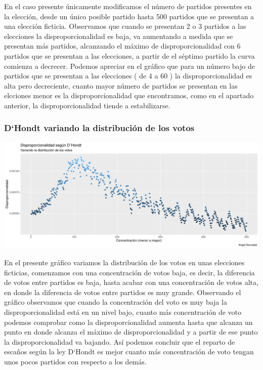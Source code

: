 \documentclass[12pt,a4paper,]{book}
\numberwithin{dummy}{section}
\theoremstyle{ocrenumbox}
\theoremstyle{blacknumex}
\theoremstyle{blacknumbox}
\theoremstyle{ocrenum}
\theoremstyle{ocrenum}
\begin{document}
En el caso presente únicamente modificamos el número de partidos
presentes en la elección, desde un único posible partido hasta 500
partidos que se presentan a una elección ficticia. Observamos que cuando
se presentan 2 o 3 partidos a las elecciones la disproporcionalidad es
baja, va aumentando a medida que se presentan más partidos, alcanzando
el máximo de disproporcionalidad con 6 partidos que se presentan a las
elecciones, a partir de el séptimo partido la curva comienza a decrecer.
Podemos apreciar en el gráfico que para un número bajo de partidos que
se presentan a las elecciones ( de 4 a 60 ) la disproporcionalidad es
alta pero decreciente, cuanto mayor número de partidos se presentan en
las elcciones menor es la disproporcionalidad que encontramos, como en
el apartado anterior, la disproporcionalidad tiende a estabilizarse.

\hypertarget{dhondt-variando-la-distribuciuxf3n-de-los-votos}{%
\subsubsection{D`Hondt variando la distribución de los
votos}\label{dhondt-variando-la-distribuciuxf3n-de-los-votos}}

\begin{center}\includegraphics[width=0.95\linewidth]{figurasR/unnamed-chunk-11-1} \end{center}

En el presente gráfico variamos la distribución de los votos en unas
elecciones ficticias, comenzamos con una concentración de votos baja, es
decir, la diferencia de votos entre partidos es baja, hasta acabar con
una concentración de votos alta, en donde la diferencia de votos entre
partidos es muy grande. Observando el gráfico observamos que cuando la
concentración del voto es muy baja la disproporcionalidad está en un
nivel bajo, cuanto más concentración de voto podemos comprobar como la
disproporcionalidad aumenta hasta que alcanza un punto en donde alcanza
el máximo de disproporcionalidad y a partir de ese punto la
disproporcionalidad va bajando. Así podemos concluir que el reparto de
escaños según la ley D`Hondt es mejor cuanto más concentración de voto
tengan unos pocos partidos con respecto a los demás.
\end{document}
